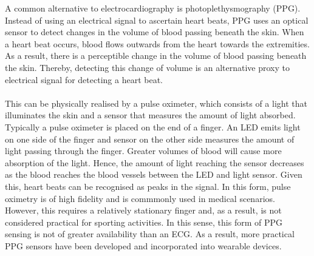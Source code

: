 A common alternative to electrocardiography is photoplethysmography (PPG).
Instead of using an electrical signal to ascertain heart beats, PPG uses an optical sensor to detect changes in the volume of blood passing beneath the skin.
When a heart beat occurs, blood flows outwards from the heart towards the extremities. As a result, there is a perceptible change in the volume of blood passing beneath the skin. Thereby, detecting this change of volume is an alternative proxy to electrical signal for detecting a heart beat.
\\\\
This can be physically realised by a pulse oximeter, which consists of a light that illuminates the skin and a sensor that measures the amount of light absorbed. Typically a pulse oximeter is placed on the end of a finger. An LED emits light on one side of the finger and sensor on the other side measures the amount of light passing through the finger.
Greater volumes of blood will cause more absorption of the light. 
Hence, the amount of light reaching the sensor decreases as the blood reaches the blood vessels between the LED and light sensor.
Given this, heart beats can be recognised as peaks in the signal. In this form, pulse oximetry is of high fidelity and is commmonly used in medical scenarios.
However, this requires a relatively stationary finger and, as a result, is not considered practical for sporting activities. In this sense, this form of PPG sensing is not of greater availability than an ECG. As a result, more practical PPG sensors have been developed and incorporated into wearable devices. 

